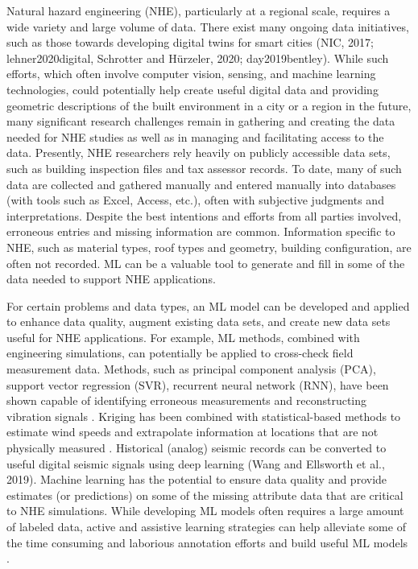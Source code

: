 Natural hazard engineering (NHE), particularly at a regional scale, requires a wide variety and large volume of data. There exist many ongoing data initiatives, such as those towards developing digital twins for smart cities (NIC, 2017; lehner2020digital, Schrotter and Hürzeler, 2020; day2019bentley). While such efforts, which often involve computer vision, sensing, and machine learning technologies, could potentially help create useful digital data and providing geometric descriptions of the built environment in a city or a region in the future, many significant research challenges remain in gathering and creating the data needed for NHE studies as well as in managing and facilitating access to the data. Presently, NHE researchers rely heavily on publicly accessible data sets, such as building inspection files and tax assessor records. To date, many of such data are collected and gathered manually and entered manually into databases (with tools such as Excel, Access, etc.), often with subjective judgments and interpretations. Despite the best intentions and efforts from all parties involved, erroneous entries and missing information are common. Information specific to NHE, such as material types, roof types and geometry, building configuration, are often not recorded. ML can be a valuable tool to generate and fill in some of the data needed to support NHE applications. 

For certain problems and data types, an ML model can be developed and applied to enhance data quality, augment existing data sets, and create new data sets useful for NHE applications. For example, ML methods, combined with engineering simulations, can potentially be applied to cross-check field measurement data. Methods, such as principal component analysis (PCA), support vector regression (SVR), recurrent neural network (RNN), have been shown capable of identifying erroneous measurements and reconstructing vibration signals \citep{kerschen2005sensor,jeong2019sensor}. Kriging has been combined with statistical-based methods to estimate wind speeds and extrapolate information at locations that are not physically measured \citep{xu2014conditional}. Historical (analog) seismic records can be converted to useful digital seismic signals using deep learning (Wang and Ellsworth et al., 2019). Machine learning has the potential to ensure data quality and provide estimates (or predictions) on some of the missing attribute data that are critical to NHE simulations. While developing ML models often requires a large amount of labeled data, active and assistive learning strategies can help alleviate some of the time consuming and laborious annotation efforts and build useful ML models \citep{joshi2009multiclass,wong2019assistive,yu2020largescale}. 

